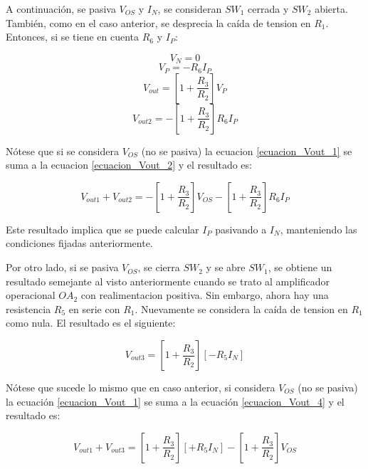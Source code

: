\documentclass[12pt,a4paper]{article}
\begin{document}
A continuación, se pasiva $V_{OS}$ y $I_N$, se consideran $SW_1$ cerrada y $SW_2$ abierta. También, como en el caso anterior, se desprecia la caída de tension en $R_1$. 
Entonces, si se tiene en cuenta $R_6$ y $I_P$:

\begin{displaymath} V_{N} = 0 \end{displaymath}
\begin{displaymath} V_{P} = - R_6 I_P \end{displaymath}
\begin{displaymath} V_{out} = [1+\frac{R_3}{R_2}] V_{P} \end{displaymath}  
\begin{equation}  V_{out2} = - [1+\frac{R_3}{R_2}] R_6 I_P \label{ecuacion_Vout_2}\end{equation}
 

Nótese que si se considera $V_{OS}$ (no se pasiva) la ecuacion \ref{ecuacion_Vout_1} se suma a la ecuacion \ref{ecuacion_Vout_2} y el resultado es:

\begin{equation} V_{out1} + V_{out2} = -[1 + \frac{R_3}{R_2}]V_{OS} - [1 + \frac{R_3}{R_2}]R_6I_P \label{ecuacion_Vout_3}\end{equation}

Este resultado implica que se puede calcular $I_P$ pasivando a $I_N$, manteniendo las condiciones fijadas anteriormente.

Por otro lado, si se pasiva $V_{OS}$, se cierra $SW_2$ y se abre $SW_1$, se obtiene un resultado semejante al visto anteriormente cuando se trato al amplificador operacional $OA_2$ con realimentacion positiva.
Sin embargo, ahora hay una resistencia $R_5$ en serie con $R_1$. Nuevamente se considera la caída de tension en $R_1$ como nula. El resultado es el siguiente:

\begin{equation} V_{out3} = [1 + \frac{R_3}{R_2}] [-R_5 I_N ]\label{ecuacion_Vout_4}\end{equation}

Nótese que sucede lo mismo que en caso anterior, si considera $V_{OS}$ (no se pasiva) la ecuación \ref{ecuacion_Vout_1} se suma a la ecuación \ref{ecuacion_Vout_4} y el resultado es:

\begin{equation} V_{out1} + V_{out3} = [1 + \frac{R_3}{R_2}] [+R_5 I_N ]  - [1 + \frac{R_3}{R_2}]V_{OS} \label{ecuacion_Vout_5}\end{equation} %
\end{document}
